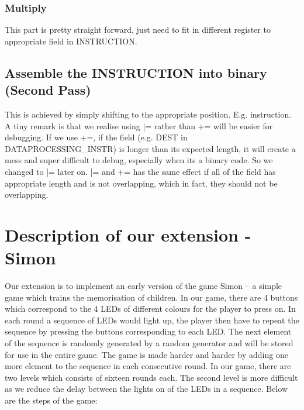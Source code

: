 \documentclass[11pt]{article}
\begin{document}
\subsubsection{Multiply}
This part is pretty straight forward, just need to fit in different register to appropriate field in INSTRUCTION.

\subsection{Assemble the INSTRUCTION into binary (Second Pass)}
This is achieved by simply shifting to the appropriate position. E.g. instruction. A tiny remark is that we realise using |= rather than += will be easier for debugging. If we use +=, if the field (e.g. DEST in DATAPROCESSING{\_}INSTR) is longer than its expected length, it will create a mess and super difficult to debug, especially when its a binary code. So we changed to |= later on. |= and += has the same effect if all of the field has appropriate length and is not overlapping, which in fact, they should not be overlapping.



\section{Description of our extension - Simon}
Our extension is to implement an early version of the game Simon -- a simple game which trains the memorisation of children. In our game, there are 4 buttons which correspond to the 4 LEDs of different colours for the player to press on. In each round a sequence of LEDs would light up, the player then have to repeat the sequence by pressing the buttons corresponding to each LED. The next element of the sequence is randomly generated by a random generator and will be stored for use in the entire game. The game is made harder and harder by adding one more element to the sequence in each consecutive round. In our game, there are two levels which consists of sixteen rounds each. The second level is more difficult as we reduce the delay between the lights on of the LEDs in a sequence. Below are the steps of the game:
\end{document}

